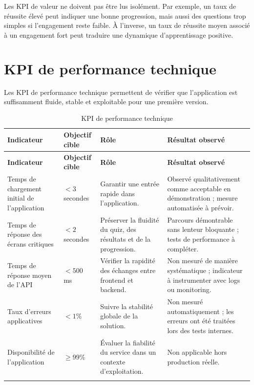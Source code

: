 \begin{tcolorbox}[
  colback=green!5,
  colframe=green!50!black,
  title={\textbf{Lecture pédagogique des KPI}},
  boxrule=0.7pt,
  enhanced,
  sharp corners,
  breakable
]
Les KPI de valeur ne doivent pas être lus isolément. 
Par exemple, un taux de réussite élevé peut indiquer une bonne progression, mais aussi des questions trop simples si l'engagement reste faible. 
À l'inverse, un taux de réussite moyen associé à un engagement fort peut traduire une dynamique d'apprentissage positive.
\end{tcolorbox}

\section{KPI de performance technique}

Les KPI de performance technique permettent de vérifier que l'application est suffisamment fluide, stable et exploitable pour une première version.

\begin{longtable}{|p{5cm}|p{3cm}|p{4cm}|p{2.5cm}|}
\hline
\rowcolor{orange!20}
\textbf{Indicateur} & \textbf{Objectif cible} & \textbf{Rôle} & \textbf{Résultat observé} \\
\hline
\endfirsthead

\hline
\rowcolor{orange!20}
\textbf{Indicateur} & \textbf{Objectif cible} & \textbf{Rôle} & \textbf{Résultat observé} \\
\hline
\endhead

Temps de chargement initial de l'application 
& $< 3$ secondes 
& Garantir une entrée rapide dans l'application. 
& Observé qualitativement comme acceptable en démonstration ; mesure automatisée à prévoir. \\
\hline

Temps de réponse des écrans critiques 
& $< 2$ secondes 
& Préserver la fluidité du quiz, des résultats et de la progression. 
& Parcours démontrable sans lenteur bloquante ; tests de performance à compléter. \\
\hline

Temps de réponse moyen de l'API 
& $< 500$ ms 
& Vérifier la rapidité des échanges entre frontend et backend. 
& Non mesuré de manière systématique ; indicateur à instrumenter avec logs ou monitoring. \\
\hline

Taux d'erreurs applicatives 
& $< 1\%$ 
& Suivre la stabilité globale de la solution. 
& Non mesuré automatiquement ; les erreurs ont été traitées lors des tests internes. \\
\hline

Disponibilité de l'application 
& $\geq 99\%$ 
& Évaluer la fiabilité du service dans un contexte d'exploitation. 
& Non applicable hors production réelle. \\
\hline
\caption{KPI de performance technique}
\label{tab:kpi-performance-technique}
\end{longtable}

